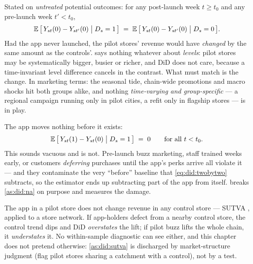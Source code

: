 \begin{assumption}\label{as:did:pt}
Stated on \emph{untreated} potential outcomes: for any post-launch week $t \ge t_0$ and any
pre-launch week $t' < t_0$,
%
\begin{equation}
  \operatorname{\mathbb{E}}\big[\, Y_{st}(0) - Y_{st'}(0) \;\big|\; D_s = 1 \,\big]
  \;=\;
  \operatorname{\mathbb{E}}\big[\, Y_{st}(0) - Y_{st'}(0) \;\big|\; D_s = 0 \,\big].
  \label{eq:did:pt}
\end{equation}
%
Had the app never launched, the pilot stores' revenue would have \emph{changed} by the same amount
as the controls'.  says nothing whatever about \emph{levels}: pilot stores may be
systematically bigger, busier or richer, and DiD does not care, because a time-invariant level
difference cancels in the contrast. What must match is the change. In marketing terms: the seasonal
tide, chain-wide promotions and macro shocks hit both groups alike, and nothing \emph{time-varying
and group-specific} --- a regional campaign running only in pilot cities, a refit only in flagship
stores --- is in play.
\end{assumption}

\begin{assumption}[No anticipation]\label{as:did:na}
The app moves nothing before it exists:
%
\begin{equation}
  \operatorname{\mathbb{E}}\big[\, Y_{st}(1) - Y_{st}(0) \;\big|\; D_s = 1 \,\big] \;=\; 0
  \qquad \text{for all } t < t_0 .
  \label{eq:did:na}
\end{equation}
%
This sounds vacuous and is not. Pre-launch buzz marketing, staff trained weeks early, or customers
\emph{deferring} purchases until the app's perks arrive all violate it --- and they contaminate the
very ``before'' baseline that \cref{eq:did:twobytwo} subtracts, so the estimator ends up
subtracting part of the app from itself.  breaks \cref{as:did:na} on purpose and
measures the damage.
\end{assumption}

\begin{assumption}\label{as:did:sutva}
The app in a pilot store does not change revenue in any control store --- SUTVA
\citep{imbens2015, rubin1980}, applied to a store network. If app-holders defect from a nearby
control store, the control trend dips and DiD \emph{overstates} the lift; if pilot buzz lifts the
whole chain, it \emph{understates} it. No within-sample diagnostic can see either, and this chapter
does not pretend otherwise: \cref{as:did:sutva} is discharged by market-structure judgment (flag
pilot stores sharing a catchment with a control), not by a test.
\end{assumption}

